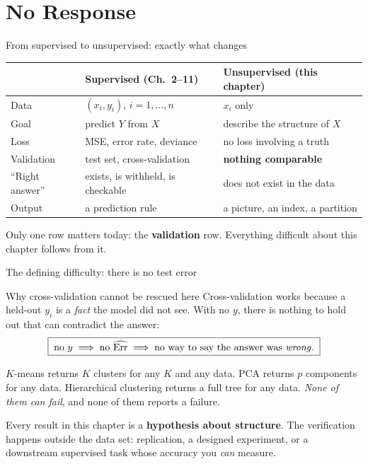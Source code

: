 \documentclass[aspectratio=169,11pt]{beamer}
\begin{document}
\section{No Response}

\begin{frame}{From supervised to unsupervised: exactly what changes}
  \begin{center}\footnotesize
  \begin{tabular}{@{}lll@{}}
    \toprule
     & \textbf{Supervised (Ch.\ 2--11)} & \textbf{Unsupervised (this chapter)} \\
    \midrule
    Data                & $(x_i, y_i)$, $i=1,\dots,n$ & $x_i$ only \\
    Goal                & predict $Y$ from $X$ & describe the structure of $X$ \\
    Loss                & MSE, error rate, deviance & no loss involving a truth \\
    Validation          & test set, cross-validation & \textbf{nothing comparable} \\
    ``Right answer''    & exists, is withheld, is checkable & does not exist in the data \\
    Output              & a prediction rule & a picture, an index, a partition \\
    \bottomrule
  \end{tabular}
  \end{center}
  \begin{takeaway}
    Only one row matters today: the \textbf{validation} row. Everything difficult about this
    chapter follows from it.
  \end{takeaway}
\end{frame}

\begin{frame}{The defining difficulty: there is no test error}
  \footnotesize
  \begin{block}{Why cross-validation cannot be rescued here}
    Cross-validation works because a held-out $y_i$ is a \emph{fact} the model did not see.
    With no $y$, there is nothing to hold out that can contradict the answer:
    \[
      \boxed{\;\text{no } y \;\Longrightarrow\; \text{no } \widehat{\mathrm{Err}}
      \;\Longrightarrow\; \text{no way to say the answer was \emph{wrong}}.\;}
    \]
  \end{block}
  \begin{readme}
    $K$-means returns $K$ clusters for any $K$ and any data. PCA returns $p$ components
    for any data. Hierarchical clustering returns a full tree for any data. \emph{None of
    them can fail}, and none of them reports a failure.
  \end{readme}
  \begin{takeaway}
    Every result in this chapter is a \textbf{hypothesis about structure}. The verification
    happens outside the data set: replication, a designed experiment, or a downstream
    supervised task whose accuracy you \emph{can} measure.
  \end{takeaway}
\end{frame}
\end{document}
